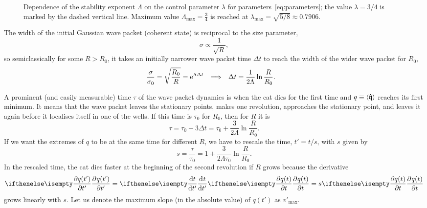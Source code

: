 \documentclass[a4paper,11pt,twoside]{article}
\begin{document}
\begin{figure}[!h]
	\centering{}
	\caption{Dependence of the stability exponent $\Lambda$ on the control parameter $\lambda$ for parameters~\eqref{eq:parameters}; the value $\lambda=3/4$ is marked by the dashed vertical line.
	Maximum value $\Lambda_{\mathrm{max}}=\frac{3}{4}$ is reached at $\lambda_{\mathrm{max}}=\sqrt{5/8}\approx0.7906$.
	}
	\label{fig:Lambda}
\end{figure}   	

The width of the initial Gaussian wave packet (coherent state) is reciprocal to the size parameter,
\begin{equation}
	\sigma\propto\frac{1}{\sqrt{R}},
\end{equation}
so semiclassically for some $R>R_0$, it takes an initially narrower wave packet time $\Delta t$ to reach the width of the wider wave packet for $R_{0}$,
\begin{align}
	\frac{\sigma}{\sigma_{0}}&=\sqrt{\frac{R_{0}}{R}}=\operatorname{e}^{\Lambda\Delta t}
	&\Longrightarrow&&
	\Delta t&=\frac{1}{2\Lambda}\ln\frac{R}{R_{0}}.
\end{align}

A prominent (and easily measurable) time $\tau$ of the wave packet dynamics is when the cat dies for the first time and $q\equiv\left\langle{\mathsf{\hat{q}}}\right\rangle$ reaches its first minimum.
It means that the wave packet leaves the stationary points, makes one revolution, approaches the stationary point, and leaves it again before it localises itself in one of the wells.
If this time is $\tau_0$ for $R_{0}$, then for $R$ it is
\begin{equation}
	\tau=\tau_{0}+3\Delta t=\tau_{0}+\frac{3}{2\Lambda}\ln\frac{R}{R_{0}}.
\end{equation}
If we want the extremes of $q$ to be at the same time for different $R$, we have to rescale the time, $t'=t/s$, with $s$ given by
\begin{equation}
	\label{eq:s}
	s=\frac{\tau}{\tau_{0}}=1+\frac{3}{2\Lambda\tau_{0}}\ln\frac{R}{R_{0}}.
\end{equation}
In the rescaled time, the cat dies faster at the beginning of the second revolution if $R$ grows because the derivative
\begin{equation}
	\partialderivative{q(t')}{t'}=\derivative{t}{t'}\partialderivative{q(t)}{t}=s\partialderivative{q(t)}{t}
\end{equation}
grows linearly with $s$. 
Let us denote the maximum slope (in the absolute value) of $q(t')$ as $v'_{\mathrm{max}}$.
\end{document}
